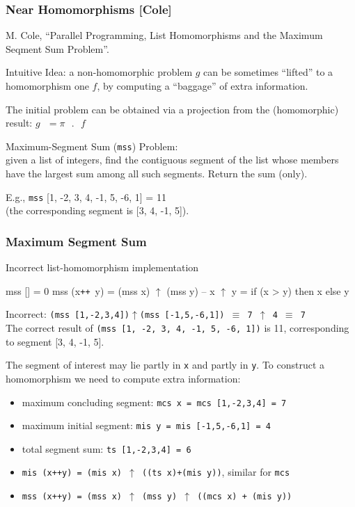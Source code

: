 \documentclass{beamer}
\renewcommand{\emph}[1]{\textcolor{structure}{#1}}
\newcommand{\emp}[1]{\textcolor{DikuRed}{ #1}}
\newcommand{\mymath}[1]{$ #1 $}
\begin{document}
\begin{frame}[fragile,t]
  \frametitle{Near Homomorphisms [Cole]}

\emp{M. Cole, ``Parallel Programming, List Homomorphisms and the Maximum Seqment Sum Problem''.} 
\bigskip

\emph{Intuitive Idea}: a non-homomorphic problem $g$ can be sometimes ``lifted'' to a 
homomorphism one $f$, by computing a ``baggage'' of extra information. 

\bigskip

The initial problem can be obtained via a projection from the (homomorphic) 
result: $g\mbox{ }=\pi\mbox{ }.\mbox{ }f$

\bigskip

\emp{Maximum-Segment Sum ({\tt mss}) Problem}: \\
given a list of integers, find the contiguous segment of the list 
whose members have the largest sum among all such segments. Return the sum (only).

\bigskip

E.g., {\tt mss} [1, -2, 3, 4, -1, 5, -6, 1] = 11 \\
(the corresponding segment is [3, 4, -1, 5]). 

\end{frame}


\begin{frame}[fragile,t]
  \frametitle{Maximum Segment Sum}

\begin{block}{Incorrect list-homomorphism implementation}
\begin{colorcode}
mss []       = 0
mss (x{\tt ++}\mbox{ }y) = (mss x) \mymath{\uparrow} (mss y) -- x \mymath{\uparrow} y = if (x > y) then x else y
\end{colorcode}
\end{block} 

\smallskip

\alert{Incorrect:} {\tt (mss [1,-2,3,4])\mymath{\uparrow}(mss [-1,5,-6,1]) $\equiv$ 7 \mymath{\uparrow} 4 $\equiv$ 7} \\
\emph{The correct result} of {\tt (mss [1, -2, 3, 4, -1, 5, -6, 1])} \emph{is} 11, corresponding to segment [3, 4, -1, 5].

\bigskip

\emph{The segment of interest may lie partly in {\tt x} and partly in {\tt y}.} 
To construct a homomorphism we need to compute extra information:\pause
\begin{itemize}
    \item maximum concluding segment: {\tt mcs x = mcs [1,-2,3,4] = 7}
    \item maximum initial segment: {\tt mis y = mis [-1,5,-6,1] = 4}
    \item total segment sum: {\tt ts [1,-2,3,4] = 6}
    \item {\tt mis (x++y) = (mis x) $\uparrow$ ((ts x)+(mis y))}, similar for {\tt mcs}    
    \item {\tt mss (x++y) = (mss x) $\uparrow$ (mss y) $\uparrow$ ((mcs x) + (mis y))}
\end{itemize}
\end{frame}
\end{document}
